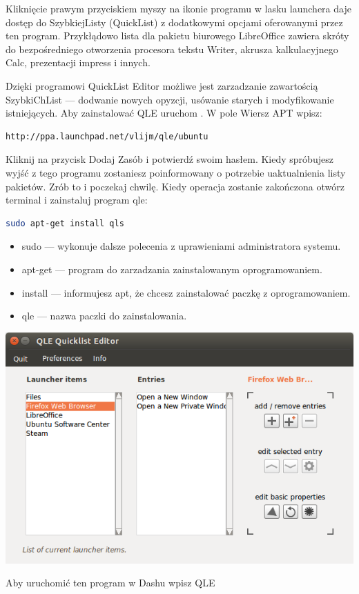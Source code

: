 Kliknięcie prawym przyciskiem myszy na ikonie programu w lasku launchera daje dostęp do SzybkiejListy (QuickList) z dodatkowymi opcjami oferowanymi przez ten program. Przykłądowo lista dla pakietu biurowego LibreOffice zawiera skróty do bezpośredniego otworzenia procesora tekstu Writer, akrusza kalkulacyjnego Calc, prezentacji impress i innych.

Dzięki programowi QuickList Editor możliwe jest zarzadzanie zawartością SzybkiChList --- dodwanie nowych opyzcji, usówanie starych i modyfikowanie istniejących. Aby zainstalować QLE uruchom . W pole \textcolor{ubuntu_orange}{Wiersz APT} wpisz:
\begin{lstlisting}
http://ppa.launchpad.net/vlijm/qle/ubuntu
\end{lstlisting}
Kliknij na przycisk \textcolor{ubuntu_orange}{Dodaj Zasób} i potwierdź swoim hasłem. Kiedy spróbujesz wyjść z tego programu zostaniesz poinformowany o potrzebie uaktualnienia listy pakietów. Zrób to i poczekaj chwilę. Kiedy operacja zostanie zakończona otwórz terminal i zainstaluj program qle:
\begin{lstlisting}[language=bash]
sudo apt-get install qls
\end{lstlisting}
\begin{itemize}
\item \textcolor{ubuntu_orange}{sudo} --- wykonuje dalsze polecenia z uprawieniami administratora systemu.
\item \textcolor{ubuntu_orange}{apt-get} --- program do zarzadzania zainstalowanym oprogramowaniem.
\item \textcolor{ubuntu_orange}{install} --- informujesz apt, że chcesz zainstalować paczkę z oprogramowaniem.
\item \textcolor{ubuntu_orange}{qle} --- nazwa paczki do zainstalowania.
\end{itemize}
\begin{center}
	\includegraphics[width=\linewidth]{images/programy_qle.png}
\end{center}

Aby uruchomić ten program w Dashu wpisz \textcolor{ubuntu_orange}{QLE}